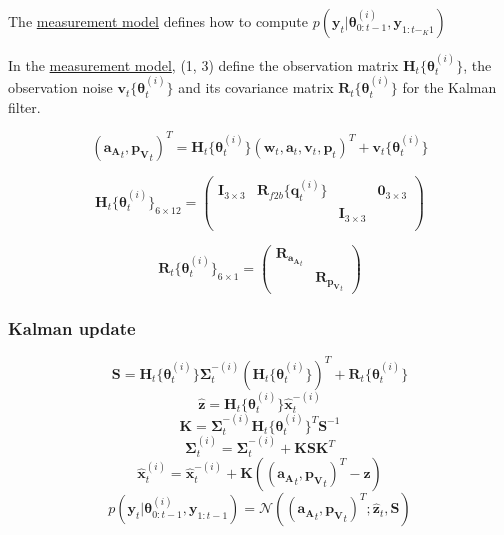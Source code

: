 \documentclass[]{article}
\begin{document}
The \protect\hyperlink{measurements-model-1}{measurement model} defines
how to compute
\(p(\mathbf{y}_t | \boldsymbol{\theta}^{(i)}_{0:t-1}, \mathbf{y}_{1:t-_K1})\)

In the \protect\hyperlink{measurements-model-1}{measurement model}, (1,
3) define the observation matrix
\(\mathbf{H}_t\{\boldsymbol{\theta}^{(i)}_t\}\), the observation noise
\(\mathbf{v}_t\{\boldsymbol{\theta}^{(i)}_t\}\) and its covariance
matrix \(\mathbf{R}_t\{\boldsymbol{\theta}^{(i)}_t\}\) for the Kalman
filter.

\[(\mathbf{a_A}_t, \mathbf{p_V}_t)^T  = \mathbf{H}_t\{\boldsymbol{\theta}^{(i)}_t\} (\mathbf{w}_t, \mathbf{a}_t, \mathbf{v}_t, \mathbf{p}_t)^T + \mathbf{v}_t\{\boldsymbol{\theta}^{(i)}_t\}\]

\[\mathbf{H}_t\{\boldsymbol{\theta}^{(i)}_t\}_{6 \times 12} = 
\left( \begin{array}{cccc}
\mathbf{I}_{3 \times 3} & \mathbf{R}_{f2b}\{\mathbf{q}^{(i)}_{t}\} & & \mathbf{0}_{3 \times 3} \\
& & \mathbf{I}_{3 \times 3} & \\
\end{array} \right)\]

\[\mathbf{R}_t\{\boldsymbol{\theta}^{(i)}_t\}_{6 \times 1} = 
\left( \begin{array}{cc}
\mathbf{R}_{\mathbf{a_A}_t } & \\
& \mathbf{R}_{\mathbf{p_V}_t }
\end{array} \right)\]

\subsubsection{Kalman update}\label{kalman-update}

\[\mathbf{S} = \mathbf{H}_t\{\boldsymbol{\theta}^{(i)}_t\} \mathbf{\Sigma}^{-(i)}_t  (\mathbf{H}_t\{\boldsymbol{\theta}^{(i)}_t\})^T + \mathbf{R}_t\{\boldsymbol{\theta}^{(i)}_t\}\]
\[\hat{\mathbf{z}} = \mathbf{H}_t\{\boldsymbol{\theta}^{(i)}_t\}  \hat{\mathbf{x}}^{-(i)}_t\]
\[\mathbf{K} = \mathbf{\Sigma}^{-(i)}_t \mathbf{H}_t\{\boldsymbol{\theta}^{(i)}_t\}^T \mathbf{S}^{-1}\]
\[\mathbf{\Sigma}^{(i)}_t = \mathbf{\Sigma}^{-(i)}_t + \mathbf{K} \mathbf{S} \mathbf{K}^T\]
\[\hat{\mathbf{x}}^{(i)}_t = \hat{\mathbf{x}}^{-(i)}_t  + \mathbf{K}((\mathbf{a_A}_t, \mathbf{p_V}_t)^T - \hat{\mathbf{z}})\]
\[p(\mathbf{y}_t | \boldsymbol{\theta}^{(i)}_{0:t-1}, \mathbf{y}_{1:t-1}) = \mathcal{N}((\mathbf{a_A}_t, \mathbf{p_V}_t)^T; \hat{\mathbf{z}}_t, \mathbf{S})\]
\end{document}
